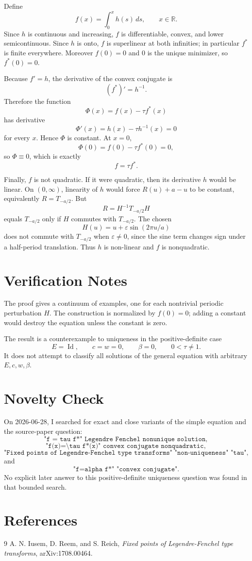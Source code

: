 \documentclass[11pt]{article}
\DeclareMathOperator{\Id}{Id}
\begin{document}
Define
\[
f(x)=\int_0^x h(s)\,ds,\qquad x\in\mathbb R.
\]
Since \(h\) is continuous and increasing, \(f\) is differentiable, convex, and
lower semicontinuous. Since \(h\) is onto, \(f\) is superlinear at both
infinities; in particular \(f^*\) is finite everywhere. Moreover \(f(0)=0\) and
\(0\) is the unique minimizer, so \(f^*(0)=0\).

Because \(f'=h\), the derivative of the convex conjugate is
\[
(f^*)'=h^{-1}.
\]
Therefore the function
\[
\Phi(x)=f(x)-\tau f^*(x)
\]
has derivative
\[
\Phi'(x)=h(x)-\tau h^{-1}(x)=0
\]
for every \(x\). Hence \(\Phi\) is constant. At \(x=0\),
\[
\Phi(0)=f(0)-\tau f^*(0)=0,
\]
so \(\Phi\equiv0\), which is exactly
\[
f=\tau f^*.
\]

Finally, \(f\) is not quadratic. If it were quadratic, then its derivative
\(h\) would be linear. On \((0,\infty)\), linearity of \(h\) would force
\(R(u)+a-u\) to be constant, equivalently \(R=T_{-a/2}\). But
\[
R=H^{-1}T_{-a/2}H
\]
equals \(T_{-a/2}\) only if \(H\) commutes with \(T_{-a/2}\). The chosen
\[
H(u)=u+\varepsilon\sin(2\pi u/a)
\]
does not commute with \(T_{-a/2}\) when \(\varepsilon\ne0\), since the sine term
changes sign under a half-period translation. Thus \(h\) is non-linear and
\(f\) is nonquadratic.

\section*{Verification Notes}

The proof gives a continuum of examples, one for each nontrivial periodic
perturbation \(H\). The construction is normalized by \(f(0)=0\); adding a
constant would destroy the equation unless the constant is zero.

The result is a counterexample to uniqueness in the positive-definite case
\[
E=\Id,\qquad c=w=0,\qquad \beta=0,\qquad 0<\tau\neq1.
\]
It does not attempt to classify all solutions of the general equation with
arbitrary \(E,c,w,\beta\).

\section*{Novelty Check}

On 2026-06-28, I searched for exact and close variants of the simple equation
and the source-paper question:
\[
\texttt{"f = tau f*" Legendre Fenchel nonunique solution},
\]
\[
\texttt{"f(x)=\textbackslash tau f\^*(x)" convex conjugate nonquadratic},
\]
\[
\texttt{"Fixed points of Legendre-Fenchel type transforms" "non-uniqueness" "tau"},
\]
and
\[
\texttt{"f=alpha f\^*" "convex conjugate"}.
\]
No explicit later answer to this positive-definite uniqueness question was
found in that bounded search.

\section*{References}

\begin{thebibliography}{9}
A. N. Iusem, D. Reem, and S. Reich,
\emph{Fixed points of Legendre-Fenchel type transforms},
arXiv:1708.00464.
\end{thebibliography}
\end{document}
